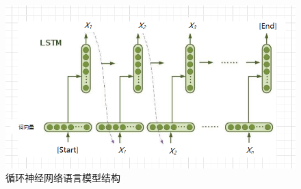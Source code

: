 \documentclass[twoside,a4paper,12pt]{book}%
\begin{document}
\begin{figure}[htbp]
\begin{center}
\includegraphics[width=5.5in]{figures/rnnlm1.png}
\caption{循环神经网络语言模型结构}\label{fig:rnnlm1}
\end{center}
\end{figure}
\end{document}
